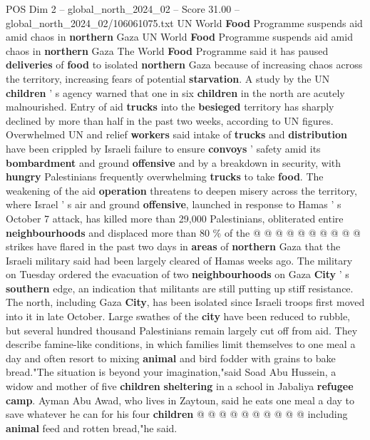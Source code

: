 \begin{textsample}{POS Dim 2 – global\_north\_2024\_02 – Score 31.00 – global\_north\_2024\_02/106061075.txt}  \label{ex:f2_pos_147}
UN World \textbf{Food} Programme suspends aid amid chaos in \textbf{northern} Gaza UN World \textbf{Food} Programme suspends aid amid chaos in \textbf{northern} Gaza The World \textbf{Food} Programme said it has paused \textbf{deliveries} of \textbf{food} to isolated \textbf{northern} Gaza because of increasing chaos across the territory, increasing fears of potential \textbf{starvation}.
A study by the UN \textbf{children} ' s agency warned that one in six \textbf{children} in the north are acutely malnourished.
Entry of aid \textbf{trucks} into the \textbf{besieged} territory has sharply declined by more than half in the past two weeks, according to UN figures.
Overwhelmed UN and relief \textbf{workers} said intake of \textbf{trucks} and \textbf{distribution} have been crippled by Israeli failure to ensure \textbf{convoys} ' safety amid its \textbf{bombardment} and ground \textbf{offensive} and by a breakdown in security, with \textbf{hungry} Palestinians frequently overwhelming \textbf{trucks} to take \textbf{food}.
The weakening of the aid \textbf{operation} threatens to deepen misery across the territory, where Israel ' s air and ground \textbf{offensive}, launched in response to Hamas ' s October 7 attack, has killed more than 29,000 Palestinians, obliterated entire \textbf{neighbourhoods} and displaced more than 80 \% of the @ @ @ @ @ @ @ @ @ @ strikes have flared in the past two days in \textbf{areas} of \textbf{northern} Gaza that the Israeli military said had been largely cleared of Hamas weeks ago.
The military on Tuesday ordered the evacuation of two \textbf{neighbourhoods} on Gaza \textbf{City} ' s \textbf{southern} edge, an indication that militants are still putting up stiff resistance.
The north, including Gaza \textbf{City}, has been isolated since Israeli troops first moved into it in late October.
Large swathes of the \textbf{city} have been reduced to rubble, but several hundred thousand Palestinians remain largely cut off from aid.
They describe famine-like conditions, in which families limit themselves to one meal a day and often resort to mixing \textbf{animal} and bird fodder with grains to bake bread."The situation is beyond your imagination,"said Soad Abu Hussein, a widow and mother of five \textbf{children} \textbf{sheltering} in a school in Jabaliya \textbf{refugee} \textbf{camp}.
Ayman Abu Awad, who lives in Zaytoun, said he eats one meal a day to save whatever he can for his four \textbf{children} @ @ @ @ @ @ @ @ @ @ including \textbf{animal} feed and rotten bread,"he said.

\end{textsample}
